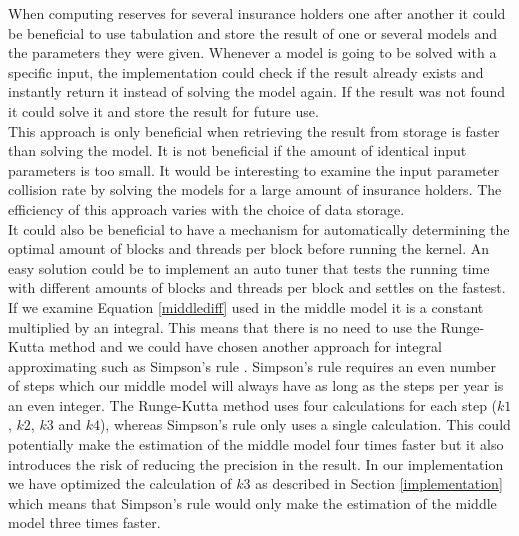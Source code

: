 


When computing reserves for several insurance holders one after another it could be beneficial to use tabulation and store the result of one or several models and the parameters they were given. Whenever a model is going to be solved with a specific input, the implementation could check if the result already exists and instantly return it instead of solving the model again. If the result was not found it could solve it and store the result for future use. \\ 

This approach is only beneficial when retrieving the result from storage is faster than solving the model. It is not beneficial if the amount of identical input parameters is too small. It would be interesting to examine the input parameter collision rate by solving the models for a large amount of insurance holders. The efficiency of this approach varies with the choice of data storage. \\

It could also be beneficial to have a mechanism for automatically determining the optimal amount of blocks and threads per block before running the kernel. An easy solution could be to implement an auto tuner that tests the running time with different amounts of blocks and threads per block and settles on the fastest. \\

If we examine Equation \ref{middlediff} used in the middle model it is a constant multiplied by an integral. This means that there is no need to use the Runge-Kutta method and we could have chosen another approach for integral approximating such as Simpson's rule \cite{simp}. Simpson's rule requires an even number of steps which our middle model will always have as long as the steps per year is an even integer. The Runge-Kutta method uses four calculations for each step ($k1$, $k2$, $k3$ and $k4$), whereas Simpson's rule only uses a single calculation. This could potentially make the estimation of the middle model four times faster but it also introduces the risk of reducing the precision in the result. In our implementation we have optimized the calculation of $k3$ as described in Section \ref{implementation} which means that Simpson's rule would only make the estimation of the middle model three times faster.
